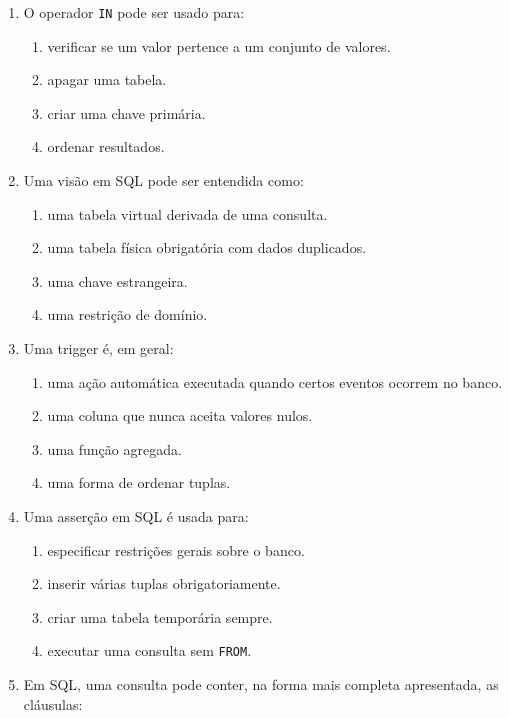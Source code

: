 \documentclass[12pt,a4paper]{article}
\begin{document}
\begin{enumerate}[label=\textbf{Q\arabic*.}]
\item O operador \texttt{IN} pode ser usado para:

\begin{enumerate}[label=\alph*)]
    \item verificar se um valor pertence a um conjunto de valores.
    \item apagar uma tabela.
    \item criar uma chave primária.
    \item ordenar resultados.
\end{enumerate}

\item Uma visão em SQL pode ser entendida como:

\begin{enumerate}[label=\alph*)]
    \item uma tabela virtual derivada de uma consulta.
    \item uma tabela física obrigatória com dados duplicados.
    \item uma chave estrangeira.
    \item uma restrição de domínio.
\end{enumerate}

\item Uma trigger é, em geral:

\begin{enumerate}[label=\alph*)]
    \item uma ação automática executada quando certos eventos ocorrem no banco.
    \item uma coluna que nunca aceita valores nulos.
    \item uma função agregada.
    \item uma forma de ordenar tuplas.
\end{enumerate}

\item Uma asserção em SQL é usada para:

\begin{enumerate}[label=\alph*)]
    \item especificar restrições gerais sobre o banco.
    \item inserir várias tuplas obrigatoriamente.
    \item criar uma tabela temporária sempre.
    \item executar uma consulta sem \texttt{FROM}.
\end{enumerate}

\item Em SQL, uma consulta pode conter, na forma mais completa apresentada, as cláusulas:


\end{enumerate}
\end{document}
